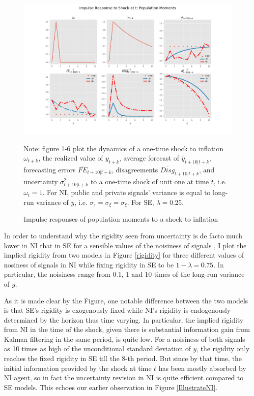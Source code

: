 \documentclass[12pt]{article}
\begin{document}
	
	\begin{figure}[ht]
		\centering
		\includegraphics[width=\textwidth]{figures/ir_popseni.png} 
		\begin{flushleft}
			{\footnotesize Note: figure 1-6 plot the dynamics of a one-time shock to inflation $\omega_{t+k}$, the realized value of $y_{t+k}$,  average forecast of $\bar y_{t+10|t+k}$, forecasting errors $\overline{FE}_{t+10|t+k}$, disagreements $\overline {Disg}_{t+10|t+k}$, and uncertainty $\bar \sigma^2_{t+10|t+k}$ to a one-time shock  of unit one at time $t$, i.e. $\omega_t=1$. For NI, public and private signals’ variance is equal to long-run variance of $y$, i.e. $\sigma_\epsilon = \sigma_\xi = \sigma_\xi $. For SE, $\lambda = 0.25$.  }
		\end{flushleft}
		\caption{Impulse responses of population moments to a shock to inflation}
		\label{ir_pop}
	\end{figure}
	
	
	
	In order to understand why the rigidity seen from uncertainty is de facto much lower in NI that in SE for a sensible values of the noisiness of signals , I plot the implied rigidity from two models in Figure \ref{rigidity} for three different values of nosiness of signals in NI while fixing rigidity in SE to be $1-\lambda =0.75$. In particular, the noisiness range from $0.1$, $1$ and $10$ times of the long-run variance of $y$. 
	
	As it is made clear by the Figure, one notable difference between the two models is that SE's rigidity is exogenously fixed while NI's rigidity is endogenously determined by the horizon thus time varying. In particular, the implied rigidity from NI in the time of the shock, given there is substantial information gain from Kalman filtering in the same period, is quite low. For a noisiness of both signals as 10 times as high of the unconditional standard deviation of $y$, the rigidity only reaches the fixed rigidity in SE till the 8-th period. But since by that time, the initial information provided by the shock at time $t$ has been mostly absorbed by NI agent, so in fact the uncertainty revision in NI is quite efficient compared to SE models.  This echoes our earlier observation in Figure \ref{IllustrateNI}. 
	
\end{document}
